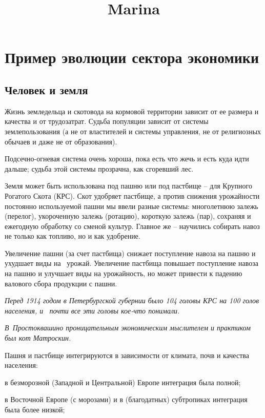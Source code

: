 \documentclass[twoside,a4paper]{article}
\title{Marina}
\begin{document}
\clearpage\setcounter{page}{1}\pagestyle{Standard}
\section[1.3 Пример эволюции сектора экономики]{ Пример эволюции сектора экономики}
\subsection[Человек и земля]{\rmfamily Человек и земля}
{
Жизнь земледельца и скотовода на кормовой территории зависит от ее размера и качества и от трудозатрат. Судьба популяции
зависит от системы землепользования (а не от властителей и системы управления, не от религиозных обычаев и даже не от
образования).}

{
Подсечно-огневая система очень хороша, пока есть что жечь и есть куда идти дальше; судьба этой системы прозрачна, как
сгоревший лес. }

{
Земля может быть использована под пашню или под пастбище – для Крупного Рогатого Скота (КРС). Скот удобряет пастбище, а
против снижения урожайности постоянно используемой пашни мы ввели разные системы: многолетнюю залежь (перелог),
укороченную залежь (ротацию), короткую залежь (пар), сохраняя и ежегодную обработку со сменой культур. Главное же –
научились собирать навоз не только как топливо, но и как удобрение.}

{
Увеличение пашни (за счет пастбища) снижает поступление навоза на пашню и ухудшает виды на \ урожай. Увеличение пастбища
повышает поступление навоза на пашню и улучшает виды на урожайность, но может привести к падению валового сбора
продукции с пашни.}

{\itshape
Перед 1914 годом в Петербургской губернии было 104 головы КРС на 100 голов населения, и \ почти все эти головы кое-что
понимали. }

{\itshape
\foreignlanguage{russian}{В}~\foreignlanguage{russian}{Простоквашино проницательным экономическим мыслителем и практиком
был кот Матроскин.}}

{
Пашня и пастбище интегрируются в зависимости от климата, почв и качества населения:}

{
в безморозной (Западной и Центральной) Европе интеграция была полной;}

{
в Восточной Европе (с морозами) и в (благодатных) субтропиках интеграция была более низкой;}
\end{document}
